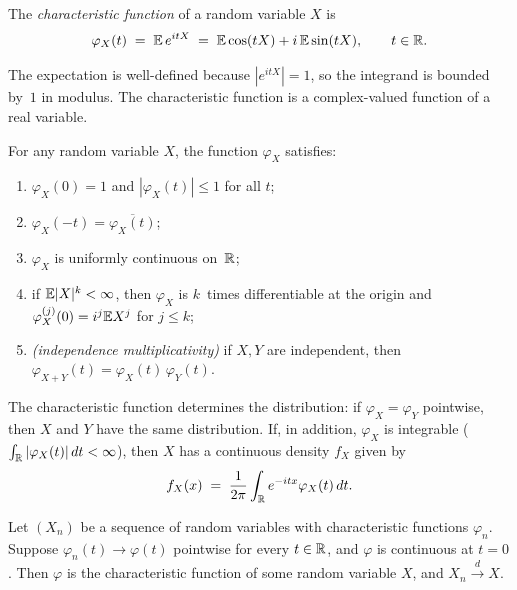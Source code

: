 \begin{definition}
\label{def:char-function}
The \emph{characteristic function} of a random variable $X$ is
\[
  \varphi_X(t) \;=\; \mathbb{E}\, e^{itX} \;=\; \mathbb{E} \cos(tX) + i\, \mathbb{E} \sin(tX), \qquad t \in \mathbb{R}.
\]
\end{definition}

The expectation is well-defined because $|e^{itX}| = 1$, so the
integrand is bounded by~$1$ in modulus. The characteristic function
is a complex-valued function of a real variable.

\begin{proposition}
\label{prop:char-properties}
For any random variable $X$, the function $\varphi_X$ satisfies:
\begin{enumerate}[label=(\alph*)]
  \item $\varphi_X(0) = 1$ and $|\varphi_X(t)| \leq 1$ for all $t$;
  \item $\varphi_X(-t) = \overline{\varphi_X(t)}$;
  \item $\varphi_X$ is uniformly continuous on~$\mathbb{R}$;
  \item if $\mathbb{E} |X|^k < \infty$, then $\varphi_X$ is $k$~times
        differentiable at the origin and
        $\varphi_X^{(j)}(0) = i^j \mathbb{E} X^j$ for $j \leq k$;
  \item \emph{(independence multiplicativity)} if $X, Y$ are
        independent, then $\varphi_{X + Y}(t) = \varphi_X(t)\, \varphi_Y(t)$.
\end{enumerate}
\end{proposition}

\begin{theorem}
\label{thm:char-uniqueness}
The characteristic function determines the distribution: if
$\varphi_X = \varphi_Y$ pointwise, then $X$ and $Y$ have the same
distribution. If, in addition, $\varphi_X$ is integrable
($\int_{\mathbb{R}} |\varphi_X(t)|\, dt < \infty$), then $X$ has a continuous
density $f_X$ given by
\[
  f_X(x) \;=\; \frac{1}{2\pi} \int_{\mathbb{R}} e^{-itx} \varphi_X(t)\, dt.
\]
\end{theorem}

\begin{theorem}
\label{thm:levy-continuity}
Let $(X_n)$ be a sequence of random variables with characteristic
functions $\varphi_n$. Suppose $\varphi_n(t) \to \varphi(t)$
pointwise for every $t \in \mathbb{R}$, and $\varphi$ is continuous at
$t = 0$. Then $\varphi$ is the characteristic function of some
random variable $X$, and $X_n \xrightarrow{d} X$.
\end{theorem}

